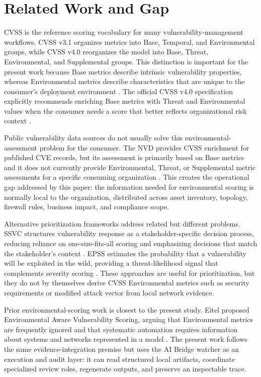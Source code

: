 \section{Related Work and Gap}
\label{sec:related}

CVSS is the reference scoring vocabulary for many vulnerability-management workflows. CVSS v3.1 organizes metrics into Base, Temporal, and Environmental groups, while CVSS v4.0 reorganizes the model into Base, Threat, Environmental, and Supplemental groups. This distinction is important for the present work because Base metrics describe intrinsic vulnerability properties, whereas Environmental metrics describe characteristics that are unique to the consumer's deployment environment \cite{firstcvss31,firstcvss40}. The official CVSS v4.0 specification explicitly recommends enriching Base metrics with Threat and Environmental values when the consumer needs a score that better reflects organizational risk context \cite{firstcvss40}.

Public vulnerability data sources do not usually solve this environmental-assessment problem for the consumer. The NVD provides CVSS enrichment for published CVE records, but its assessment is primarily based on Base metrics and it does not currently provide Environmental, Threat, or Supplemental metric assessments for a specific consuming organization \cite{nvdmetrics}. This creates the operational gap addressed by this paper: the information needed for environmental scoring is normally local to the organization, distributed across asset inventory, topology, firewall rules, business impact, and compliance scope.

Alternative prioritization frameworks address related but different problems. SSVC structures vulnerability response as a stakeholder-specific decision process, reducing reliance on one-size-fits-all scoring and emphasizing decisions that match the stakeholder's context \cite{ssvc2021,cisassvc}. EPSS estimates the probability that a vulnerability will be exploited in the wild, providing a threat-likelihood signal that complements severity scoring \cite{epss2021,firstepss}. These approaches are useful for prioritization, but they do not by themselves derive CVSS Environmental metrics such as security requirements or modified attack vector from local network evidence.

Prior environmental-scoring work is closest to the present study. Eitel proposed Environmental Aware Vulnerability Scoring, arguing that Environmental metrics are frequently ignored and that systematic automation requires information about systems and networks represented in a model \cite{eitel2020environmental}. The present work follows the same evidence-integration premise but uses the AI Bridge watcher as an execution and audit layer: it can read structured local artifacts, coordinate specialized review roles, regenerate outputs, and preserve an inspectable trace.

